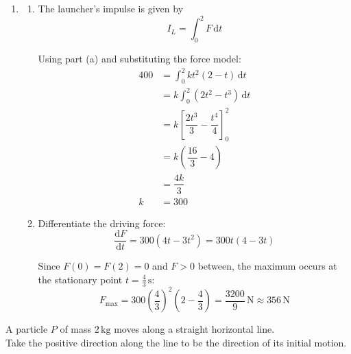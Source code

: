 \documentclass[leqno]{article}
\begin{document}
\begin{enumerate}[
  label=\textbf{\arabic*.},
  leftmargin=*,
  topsep=0pt,
  partopsep=0pt,
  parsep=0pt
]
\begin{djsSolution}
\begin{enumerate}[label=\textbf{(\alph*)}, start=1]
The impulse of a variable force is
\[
I=\int_{t_0}^{t_1}F\,\mathrm{d}t
\]

Let \(I_L\) be the impulse exerted by the launcher. The resistance acts in the negative direction, so
\begin{align*}
I_L+\int_0^2(-40)\,\mathrm{d}t&=80(7-3)\\
I_L-80&=320\\
I_L&=400\,\mathrm{N\,s}
\end{align*}

\item
\begin{enumerate}[label=(\roman*), start=1]
\item The launcher's impulse is given by
\[
I_L=\int_0^2 F\,\mathrm{d}t
\]

Using part (a) and substituting the force model:
\begin{align*}
400&=\int_0^2 kt^2(2-t)\,\mathrm{d}t\\
&=k\int_0^2(2t^2-t^3)\,\mathrm{d}t\\
&=k\left[\dfrac{2t^3}{3}-\dfrac{t^4}{4}\right]_0^2\\
&=k\left(\dfrac{16}{3}-4\right)\\
&=\dfrac{4k}{3}\\
k&=300
\end{align*}

\item Differentiate the driving force:
\[
\dfrac{\mathrm{d}F}{\mathrm{d}t}
=300(4t-3t^2)
=300t(4-3t)
\]

Since \(F(0)=F(2)=0\) and \(F>0\) between, the maximum occurs at the stationary point \(t=\frac43\,\mathrm{s}\):
\[
F_{\max}
=300\left(\dfrac43\right)^2\left(2-\dfrac43\right)
=\dfrac{3200}{9}\,\mathrm{N}
\approx356\,\mathrm{N}
\]

\end{enumerate}
\end{enumerate}
\end{djsSolution}

\newpage

\questionitem

A particle $P$ of mass $2\,\mathrm{kg}$ moves along a straight horizontal line. \\
Take the positive direction along the line to be the direction of its initial motion. \\


\end{enumerate}
\end{document}
